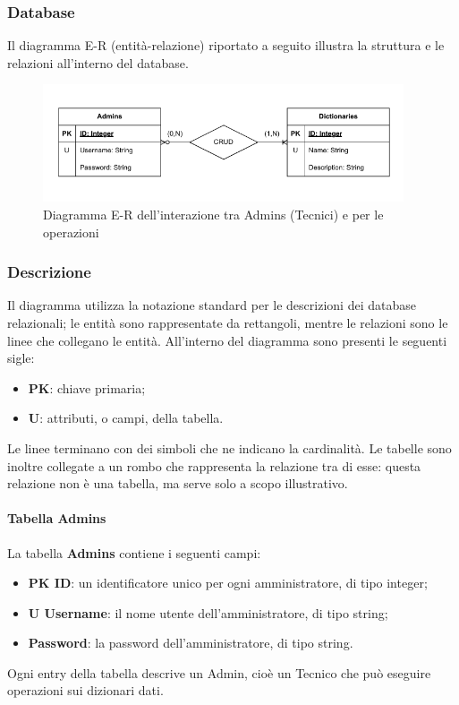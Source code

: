 \subsubsection{Database}

\par Il diagramma E-R (entità-relazione) riportato a seguito illustra la struttura e le relazioni all'interno del database.

\begin{figure}[H]
    \centering
    \includegraphics[width=0.95\textwidth]{assets/Database/DiagrammiDB.png}
    \caption{Diagramma E-R dell'interazione tra Admins (Tecnici) e  per le operazioni }
\end{figure}

\subsubsection{Descrizione}
\par Il diagramma utilizza la notazione standard per le descrizioni dei database relazionali; le entità sono rappresentate da rettangoli, mentre le relazioni sono le linee che collegano le entità. All'interno del diagramma sono presenti le seguenti sigle:
\begin{itemize}
    \item \textbf{PK}: chiave primaria;
    \item \textbf{U}: attributi, o campi, della tabella.
\end{itemize}

\par Le linee terminano con dei simboli che ne indicano la cardinalità. Le tabelle sono inoltre collegate a un rombo che rappresenta la relazione tra di esse: questa relazione non è una tabella, ma serve solo a scopo illustrativo.

\paragraph{Tabella Admins}
\par La tabella \textbf{Admins} contiene i seguenti campi:
\begin{itemize}
    \item \textbf{PK ID}: un identificatore unico per ogni amministratore, di tipo integer;
    \item \textbf{U Username}: il nome utente dell'amministratore, di tipo string;
    \item \textbf{Password}: la password dell'amministratore, di tipo string.
\end{itemize}
\par Ogni entry della tabella descrive un Admin, cioè un Tecnico che può eseguire operazioni  sui dizionari dati.

